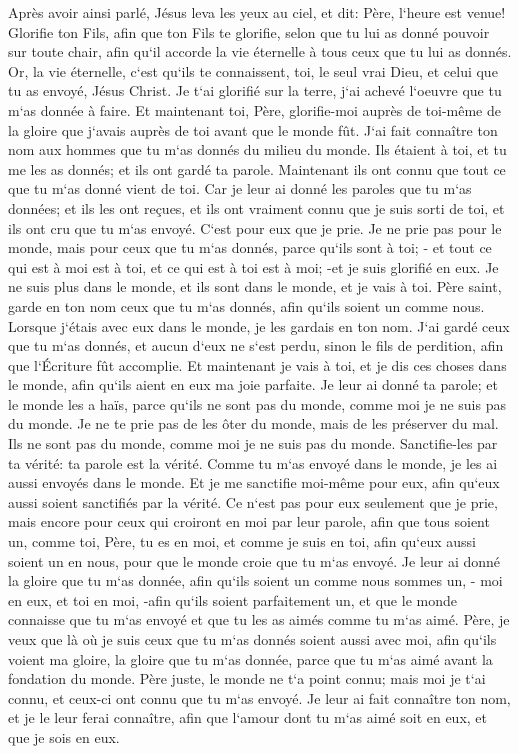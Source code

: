 \verse Après avoir ainsi parlé, Jésus leva les yeux au ciel, et dit: Père, l`heure est venue! Glorifie ton Fils, afin que ton Fils te glorifie, 
\verse selon que tu lui as donné pouvoir sur toute chair, afin qu`il accorde la vie éternelle à tous ceux que tu lui as donnés. 
\verse Or, la vie éternelle, c`est qu`ils te connaissent, toi, le seul vrai Dieu, et celui que tu as envoyé, Jésus Christ. 
\verse Je t`ai glorifié sur la terre, j`ai achevé l`oeuvre que tu m`as donnée à faire. 
\verse Et maintenant toi, Père, glorifie-moi auprès de toi-même de la gloire que j`avais auprès de toi avant que le monde fût. 
\verse J`ai fait connaître ton nom aux hommes que tu m`as donnés du milieu du monde. Ils étaient à toi, et tu me les as donnés; et ils ont gardé ta parole. 
\verse Maintenant ils ont connu que tout ce que tu m`as donné vient de toi. 
\verse Car je leur ai donné les paroles que tu m`as données; et ils les ont reçues, et ils ont vraiment connu que je suis sorti de toi, et ils ont cru que tu m`as envoyé. 
\verse C`est pour eux que je prie. Je ne prie pas pour le monde, mais pour ceux que tu m`as donnés, parce qu`ils sont à toi; - 
\verse et tout ce qui est à moi est à toi, et ce qui est à toi est à moi; -et je suis glorifié en eux. 
\verse Je ne suis plus dans le monde, et ils sont dans le monde, et je vais à toi. Père saint, garde en ton nom ceux que tu m`as donnés, afin qu`ils soient un comme nous. 
\verse Lorsque j`étais avec eux dans le monde, je les gardais en ton nom. J`ai gardé ceux que tu m`as donnés, et aucun d`eux ne s`est perdu, sinon le fils de perdition, afin que l`Écriture fût accomplie. 
\verse Et maintenant je vais à toi, et je dis ces choses dans le monde, afin qu`ils aient en eux ma joie parfaite. 
\verse Je leur ai donné ta parole; et le monde les a haïs, parce qu`ils ne sont pas du monde, comme moi je ne suis pas du monde. 
\verse Je ne te prie pas de les ôter du monde, mais de les préserver du mal. 
\verse Ils ne sont pas du monde, comme moi je ne suis pas du monde. 
\verse Sanctifie-les par ta vérité: ta parole est la vérité. 
\verse Comme tu m`as envoyé dans le monde, je les ai aussi envoyés dans le monde. 
\verse Et je me sanctifie moi-même pour eux, afin qu`eux aussi soient sanctifiés par la vérité. 
\verse Ce n`est pas pour eux seulement que je prie, mais encore pour ceux qui croiront en moi par leur parole, 
\verse afin que tous soient un, comme toi, Père, tu es en moi, et comme je suis en toi, afin qu`eux aussi soient un en nous, pour que le monde croie que tu m`as envoyé. 
\verse Je leur ai donné la gloire que tu m`as donnée, afin qu`ils soient un comme nous sommes un, - 
\verse moi en eux, et toi en moi, -afin qu`ils soient parfaitement un, et que le monde connaisse que tu m`as envoyé et que tu les as aimés comme tu m`as aimé. 
\verse Père, je veux que là où je suis ceux que tu m`as donnés soient aussi avec moi, afin qu`ils voient ma gloire, la gloire que tu m`as donnée, parce que tu m`as aimé avant la fondation du monde. 
\verse Père juste, le monde ne t`a point connu; mais moi je t`ai connu, et ceux-ci ont connu que tu m`as envoyé. 
\verse Je leur ai fait connaître ton nom, et je le leur ferai connaître, afin que l`amour dont tu m`as aimé soit en eux, et que je sois en eux. 

